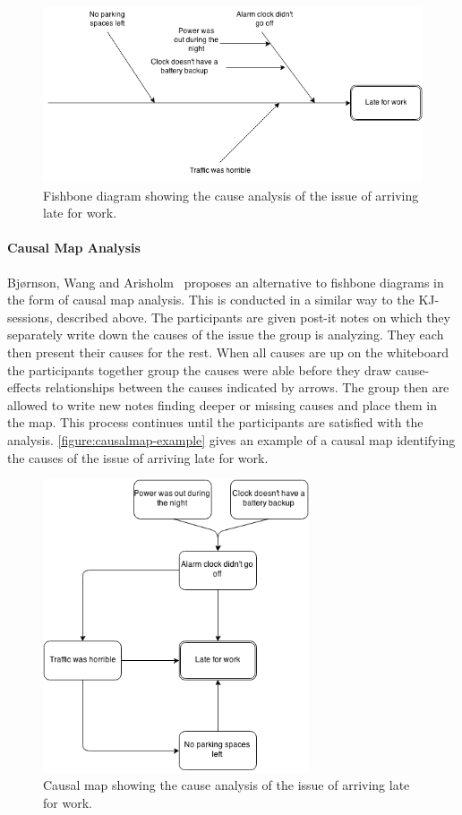 \documentclass[12pt]{article}
\begin{document}
\begin{figure}[h!]
	\centering
	\includegraphics[width=\textwidth]{figures/fishbone-example.png}
	\caption{Fishbone diagram showing the cause analysis of the issue of arriving late for work.}
	\label{figure:fishbone-example}
\end{figure}

\paragraph{Causal Map Analysis}
Bjørnson, Wang and Arisholm~\cite{Wang2012} proposes an alternative to fishbone diagrams in the form of causal map analysis. This is conducted in a similar way to the KJ-sessions, described above. The participants are given post-it notes on which they separately write down the causes of the issue the group is analyzing. They each then present their causes for the rest. When all causes are up on the whiteboard the participants together group the causes were able before they draw cause-effects relationships between the causes indicated by arrows. The group then are allowed to write new notes finding deeper or missing causes and place them in the map. This process continues until the participants are satisfied with the analysis. \autoref{figure:causalmap-example} gives an example of a causal map identifying the causes of the issue of arriving late for work.

\begin{figure}[h!]
	\centering
	\includegraphics[width=0.7\textwidth]{figures/causalmap-example.png}
	\caption{Causal map showing the cause analysis of the issue of arriving late for work.}
	\label{figure:causalmap-example}
\end{figure}
\end{document}
